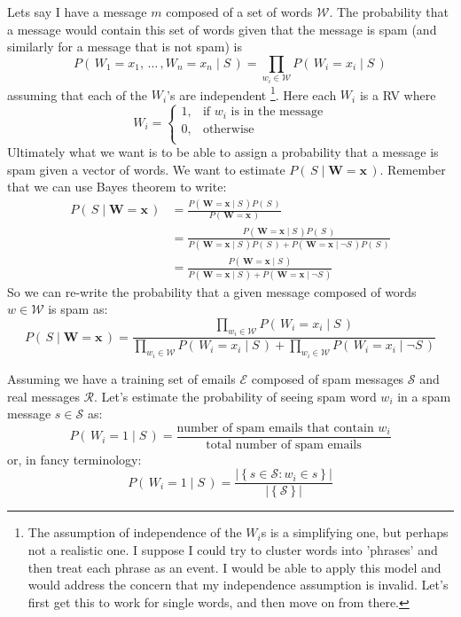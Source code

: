 \documentclass[11pt, oneside]{article}   	%
\newcommand{\ffrac}[2]{\ensuremath{\frac{\displaystyle #1}{\displaystyle #2}}}
\begin{document}
Lets say I have a message $m$ composed of a set of words \(\mathcal{W}\). The probability that a message would contain this set of words given that the message is spam (and similarly for a message that is not spam) is \[P(\,W_1 = x_1,\, \ldots \,, W_n = x_n \mid S \,) = \prod_{w_i \in \mathcal{W}}P(\,W_i=x_i\mid S\,)\] assuming that each of the \(W_i\)'s are independent \footnote{The assumption of independence of the \(W_i \)s is a simplifying one, but perhaps not a realistic one. I suppose I could try to cluster words into 'phrases' and then treat each phrase as an event. I would be able to apply this model and would address the concern that my independence assumption is invalid. Let's first get this to work for single words, and then move on from there.}. Here each \(W_i\) is a RV where 
\[
W_i= \begin{cases}
1, & \text{if } w_i \text{ is in the message} \\
0,  & \text{otherwise} \\
\end{cases}
\]
Ultimately what we want is to be able to assign a probability that a message is spam given a vector of words. We want to estimate $P(\,S \mid \bm{W} = \bm{x}\,)$. Remember that we can use Bayes theorem to write:
\begin{align*}
P(\,S\mid \bm{W}=\bm{x}\,) &= \frac 
	{P(\,\bm{W}=\bm{x} \mid S\,)P(\,S\,)} 
	{P(\,\bm{W}=\bm{x}\,)} \\
	&= \frac
	{P(\,\bm{W}=\bm{x} \mid S\,)P(\,S\,)} 
	{P(\,\bm{W}=\bm{x} \mid S\,)P(\,S\,) + P(\,\bm{W}=\bm{x} \mid \neg S\,)P(\,S\,)}  \\
	&= \frac
	{P(\,\bm{W}=\bm{x} \mid S\,)} 
	{P(\,\bm{W}=\bm{x} \mid S\,) + P(\,\bm{W}=\bm{x} \mid \neg S\,)}
\end{align*}
So we can re-write the probability that a given message composed of words $w \in \mathcal{W}$ is spam as:
\begin{equation}
P(\,S\mid \bm{W}=\bm{x}\,) = \ffrac
	{ \prod_{w_i \in \mathcal{W}} P(\,W_i=x_i \mid S\,)}
	{ \prod_{w_i \in \mathcal{W}} P(\,W_i=x_i \mid S\,) + \prod_{w_i \in \mathcal{W}} P(\,W_i=x_i \mid \neg S\,)}
\end{equation}

Assuming we have a training set of emails \(\mathcal{E}\) composed of spam messages \(\mathcal{S}\) and real messages \(\mathcal{R}\). Let's estimate the probability of seeing spam word $w_i$ in a spam message $s \in \mathcal{S}$ as:
\[
P(\,W_i=1 \mid S\,)=\frac{\text{number of spam emails that contain } w_i}{\text{total number of spam emails}} 
\]
or, in fancy terminology:
\begin{equation}
P(\,W_i=1 \mid S\,)=\frac{ \left\vert\left\{ s \in \mathcal{S} : w_i \in s \right\}\right\vert }{\left\vert\left\{ \mathcal{S} \right\}\right\vert}
\end{equation}
\end{document}
